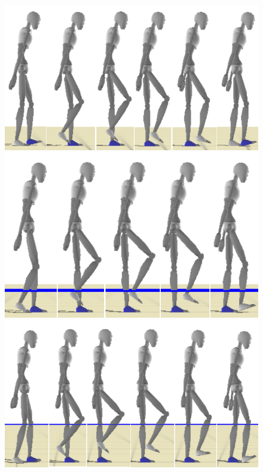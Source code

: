 \documentclass[runningheads,a4paper]{llncs}
\begin{document}
\begin{figure}[h]
\centering
\includegraphics[scale=0.3]{strips/03_0cm.png}
\includegraphics[scale=0.3]{strips/03_25cm.png}
\includegraphics[scale=0.3]{strips/03_50cm.png}

\end{figure}
\end{document}
